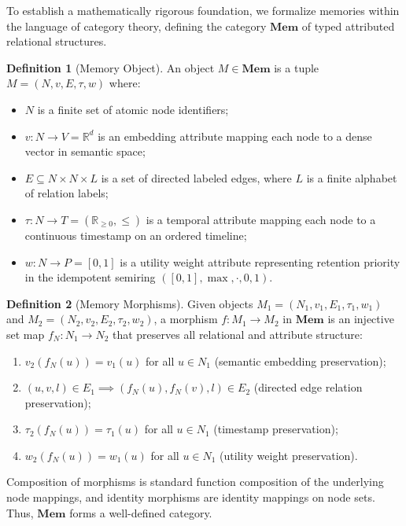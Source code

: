 \documentclass[11pt,a4paper]{article}
\theoremstyle{definition}
\newtheorem{definition}{Definition}[section]
\begin{document}
To establish a mathematically rigorous foundation, we formalize memories within the language of category theory, defining the category $\mathbf{Mem}$ of typed attributed relational structures.

\begin{definition}[Memory Object]
An object $M \in \mathbf{Mem}$ is a tuple $M = (N, v, E, \tau, w)$ where:
\begin{itemize}
    \item $N$ is a finite set of atomic node identifiers;
    \item $v : N \to V = \mathbb{R}^d$ is an embedding attribute mapping each node to a dense vector in semantic space;
    \item $E \subseteq N \times N \times L$ is a set of directed labeled edges, where $L$ is a finite alphabet of relation labels;
    \item $\tau : N \to T = (\mathbb{R}_{\geq 0}, \leq)$ is a temporal attribute mapping each node to a continuous timestamp on an ordered timeline;
    \item $w : N \to P = [0,1]$ is a utility weight attribute representing retention priority in the idempotent semiring $([0,1], \max, \cdot, 0, 1)$.
\end{itemize}
\end{definition}

\begin{definition}[Memory Morphisms]
Given objects $M_1 = (N_1, v_1, E_1, \tau_1, w_1)$ and $M_2 = (N_2, v_2, E_2, \tau_2, w_2)$, a morphism $f : M_1 \to M_2$ in $\mathbf{Mem}$ is an injective set map $f_N : N_1 \to N_2$ that preserves all relational and attribute structure:
\begin{enumerate}
    \item $v_2(f_N(u)) = v_1(u)$ for all $u \in N_1$ (semantic embedding preservation);
    \item $(u, v, l) \in E_1 \implies (f_N(u), f_N(v), l) \in E_2$ (directed edge relation preservation);
    \item $\tau_2(f_N(u)) = \tau_1(u)$ for all $u \in N_1$ (timestamp preservation);
    \item $w_2(f_N(u)) = w_1(u)$ for all $u \in N_1$ (utility weight preservation).
\end{enumerate}
Composition of morphisms is standard function composition of the underlying node mappings, and identity morphisms are identity mappings on node sets. Thus, $\mathbf{Mem}$ forms a well-defined category.
\end{definition}
\end{document}
